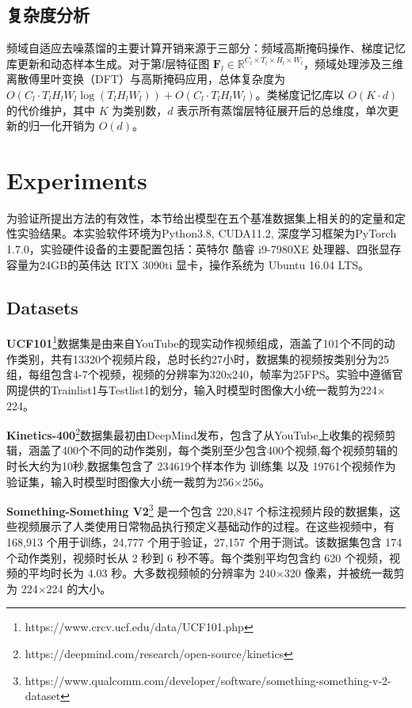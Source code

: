 \documentclass[10.5pt,letterpaper]{article}
\begin{document}
\subsection{复杂度分析}
频域自适应去噪蒸馏的主要计算开销来源于三部分：频域高斯掩码操作、梯度记忆库更新和动态样本生成。对于第$l$层特征图 $\textbf{F}_l \in \mathbb{R}^{C_l \times T_l \times H_l \times W_l}$，频域处理涉及三维离散傅里叶变换（DFT）与高斯掩码应用，总体复杂度为 $O(C_l \cdot T_lH_lW_l \log(T_lH_lW_l)) + O(C_l \cdot T_lH_lW_l)$。类梯度记忆库以 $O(K \cdot d)$ 的代价维护，其中 $K$ 为类别数，$d$ 表示所有蒸馏层特征展开后的总维度，单次更新的归一化开销为 $O(d)$。



\section{Experiments}
为验证所提出方法的有效性，本节给出模型在五个基准数据集上相关的的定量和定性实验结果。本实验软件环境为Python3.8, CUDA11.2, 深度学习框架为PyTorch 1.7.0，实验硬件设备的主要配置包括：英特尔 酷睿 i9-7980XE 处理器、四张显存容量为24GB的英伟达 RTX 3090ti 显卡，操作系统为 Ubuntu 16.04 LTS。

	\subsection{Datasets}

\textbf{UCF101}\footnote{https://www.crcv.ucf.edu/data/UCF101.php}数据集\cite{soomro-arxiv2012-ucf101}是由来自YouTube的现实动作视频组成，涵盖了101个不同的动作类别，共有13320个视频片段，总时长约27小时，数据集的视频按类别分为25组，每组包含4-7个视频，视频的分辨率为320x240，帧率为25FPS。实验中遵循官网提供的Trainlist1与Testlist1的划分，输入时模型时图像大小统一裁剪为224$\times$224。

\textbf{Kinetics-400}\footnote{https://deepmind.com/research/open-source/kinetics}数据集\cite{kay-arXiv2017-kinetics}最初由DeepMind发布，包含了从YouTube上收集的视频剪辑，涵盖了400个不同的动作类别，每个类别至少包含400个视频,每个视频剪辑的时长大约为10秒,数据集包含了 234619个样本作为 训练集 以及 19761个视频作为验证集，输入时模型时图像大小统一裁剪为256$\times$256。	

\textbf{Something-Something V2}\footnote{https://www.qualcomm.com/developer/software/something-something-v-2-dataset}\cite{goyal-iccv2017-sthsth} 是一个包含 220,847 个标注视频片段的数据集，这些视频展示了人类使用日常物品执行预定义基础动作的过程。在这些视频中，有 168,913 个用于训练，24,777 个用于验证，27,157 个用于测试。该数据集包含 174 个动作类别，视频时长从 2 秒到 6 秒不等。每个类别平均包含约 620 个视频，视频的平均时长为 4.03 秒。大多数视频帧的分辨率为 240$\times$320 像素，并被统一裁剪为 224$\times$224 的大小。
\end{document}
